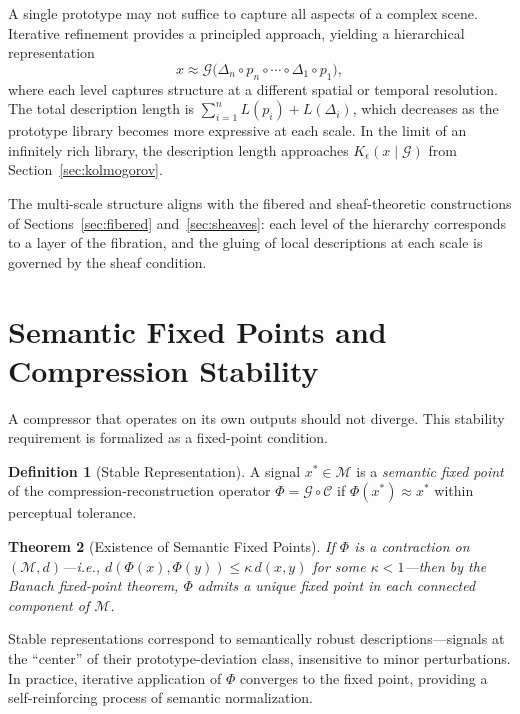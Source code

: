 \documentclass[11pt,a4paper]{article}
\newtheorem{theorem}{Theorem}[section]
\theoremstyle{definition}
\newtheorem{definition}[theorem]{Definition}
\theoremstyle{remark}
\begin{document}
A single prototype may not suffice to capture all aspects of a complex scene. Iterative refinement provides a principled approach, yielding a hierarchical representation
\[
x \approx \mathcal{G}\big(\Delta_n \circ p_n \circ \cdots \circ \Delta_1 \circ p_1\big),
\]
where each level captures structure at a different spatial or temporal resolution. The total description length is $\sum_{i=1}^n L(p_i) + L(\Delta_i)$, which decreases as the prototype library becomes more expressive at each scale. In the limit of an infinitely rich library, the description length approaches $K_\epsilon(x \mid \mathcal{G})$ from Section~\ref{sec:kolmogorov}.

The multi-scale structure aligns with the fibered and sheaf-theoretic constructions of Sections~\ref{sec:fibered} and~\ref{sec:sheaves}: each level of the hierarchy corresponds to a layer of the fibration, and the gluing of local descriptions at each scale is governed by the sheaf condition.

\section{Semantic Fixed Points and Compression Stability}
\label{sec:stability}

A compressor that operates on its own outputs should not diverge. This stability requirement is formalized as a fixed-point condition.

\begin{definition}[Stable Representation]
A signal $x^* \in \mathcal{M}$ is a \emph{semantic fixed point} of the compression-reconstruction operator $\Phi = \mathcal{G} \circ \mathcal{C}$ if $\Phi(x^*) \approx x^*$ within perceptual tolerance.
\end{definition}

\begin{theorem}[Existence of Semantic Fixed Points]
If $\Phi$ is a contraction on $(\mathcal{M}, d)$---i.e., $d(\Phi(x), \Phi(y)) \le \kappa \, d(x,y)$ for some $\kappa < 1$---then by the Banach fixed-point theorem, $\Phi$ admits a unique fixed point in each connected component of $\mathcal{M}$.
\end{theorem}

Stable representations correspond to semantically robust descriptions---signals at the ``center'' of their prototype-deviation class, insensitive to minor perturbations. In practice, iterative application of $\Phi$ converges to the fixed point, providing a self-reinforcing process of semantic normalization.
\end{document}
